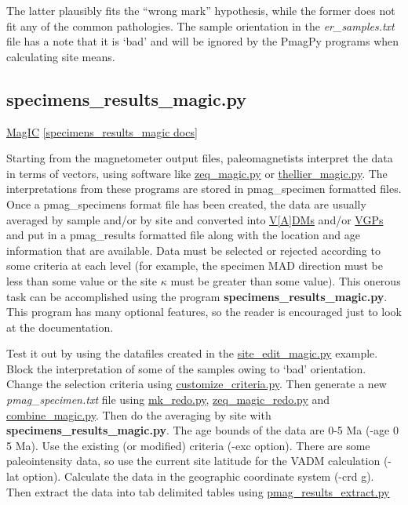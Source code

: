 \documentclass[11pt]{book}
\begin{document}
{{  The latter plausibly fits the ``wrong mark'' hypothesis, while the former does not fit any of the common pathologies.  The sample orientation in the {\it er\_samples.txt} file has a note that it is `bad' and will be ignored by the PmagPy programs when calculating site means.    
  
  


\subsection{specimens\_results\_magic.py} 
\href{#MagIC}{MagIC}
\href{http://earthref.org/PmagPy/pmagpydocs/specimens_results_magic-module.html}{[specimens\_results\_magic docs]}

Starting from the magnetometer output files, paleomagnetists interpret the data in terms of vectors, using software like \href{#zeq_magic.py}{zeq\_magic.py} or \href{thellier_magic.py}{thellier\_magic.py}.  The interpretations from these programs are stored in pmag\_specimen formatted files.   
Once a pmag\_specimens format file has been created, the data are usually  averaged by sample and/or by site and converted into \href{http://magician.ucsd.edu/Essentials_2/WebBook2ch2.html#Virtual_dipole_moment}{V[A]DMs} and/or 
\href{http://magician.ucsd.edu/Essentials_2/WebBook2ch2.html#Virtual_geomagnetic_poles}{VGPs} and put in a pmag\_results formatted file along with the location and age information that are available.  Data must be selected or rejected according to some criteria at each level (for example, the specimen MAD direction must be less than some value or the site $\kappa$ must be greater than some value).   This onerous task can be accomplished using the program {\bf specimens\_results\_magic.py}.          This program has many optional features, so the reader is encouraged just to look at the documentation.   

Test it out  by using the datafiles created in the \href{#site_edit_magic.py}{site\_edit\_magic.py} example.  Block the interpretation of some of the samples owing to `bad' orientation.  Change the selection criteria using \href{customize_criteria.py}{customize\_criteria.py}.    Then generate a new {\it pmag\_specimen.txt} file using \href{#mk_redo.py}{mk\_redo.py},  \href{#zeq_magic_redo.py}{zeq\_magic\_redo.py} and \href{#combine_magic.py}{combine\_magic.py}.   Then do the averaging by site with {\bf specimens\_results\_magic.py}.  The age bounds of the data are 0-5 Ma (-age 0 5 Ma).  Use the existing (or modified) criteria (-exc option).   There are some paleointensity data, so use the current site latitude for the VADM  calculation (-lat option).   Calculate the data in the geographic coordinate system (-crd g).    Then extract the data into tab delimited tables using \href{#pmag_results_extract.py}{pmag\_results\_extract.py}

}}
\end{document}
